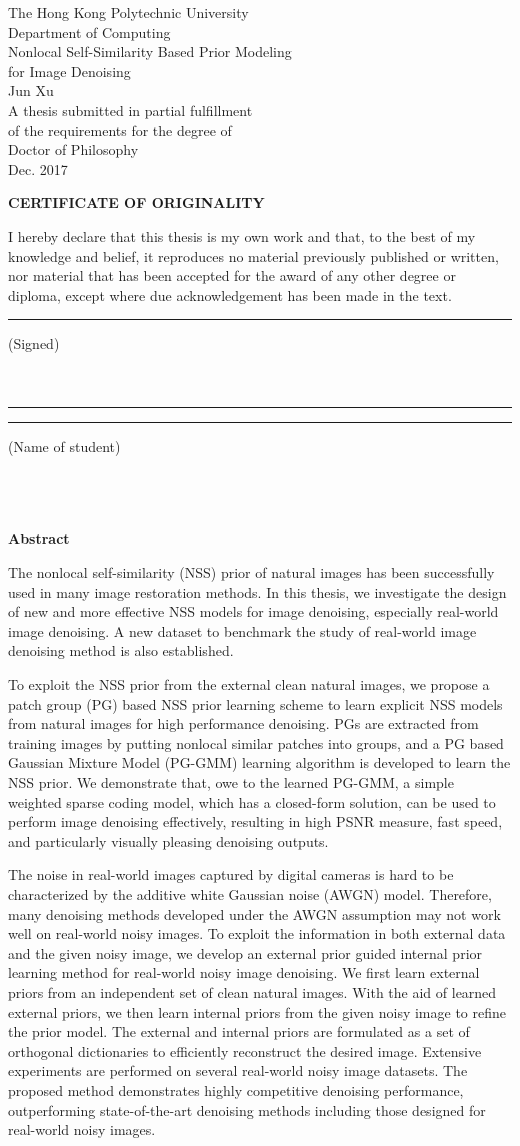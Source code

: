 \documentclass[12pt,oneside]{report}
\makeatletter
\numberwithin{figure}{chapter}
\newenvironment{preliminary}%
{\pagestyle{plain}\pagenumbering{roman}}%
{\pagenumbering{arabic}}
\newcommand\isdefinedsig[1]{%
  \edef\@tempa{#1}%
  \def\@tempb{}%
  \ifx\@tempa\@tempb
	\else\rule[-4.5pt]{5.5cm}{0.5pt}\signname\\ \\{#1}\\
  \fi
}
\newcommand\isdefinedsigname[1]{%
  \edef\@tempa{#1}%
  \def\@tempb{}%
  \ifx\@tempa\@tempb
	\else\rule[-5pt]{0.05cm}{0.5pt}\underline{}\rule[-5pt]{4cm}{0.5pt}\stuname\\ \\{#1}\\%
  \fi
}
\newcommand\isdefinedspinetitle[1]{%
  \edef\@tempa{#1}%
  \def\@tempb{}%
  \ifx\@tempa\@tempb
	\else (Spine title: #1)\\
  \fi
}
\newcommand{\signname}{(Signed)}
\newcommand{\stuname}{(Name of student)}
\newcommand{\department}{Computing}
\newcommand{\degree}{Doctor of Philosophy}
\newcommand{\firstname}{Jun}
\newcommand{\middlename}{}
\newcommand{\lastname}{Xu}
\newcommand{\authorname}{{\firstname} {\middlename} {\lastname}}
\newcommand{\titl}{Real-time and Robust Visual Tracking}
\newcommand{\thesisformat}{Monograph} %
\newcommand{\gyear}{\number\year}
\renewcommand{\maketitle}
{\begin{titlepage}
   \setcounter{page}{1}
   \begin{large}
   \begin{center}
      \mbox{}
      \vfill
	{\LARGE The Hong Kong Polytechnic University} \\
    {\Large Department of Computing}\\
      \vfill
      {\LARGE Nonlocal Self-Similarity Based Prior Modeling \\for Image Denoising} \\
      \vfill
       {\firstname}  {\lastname}\\

      \vfill
		A thesis submitted in partial fulfillment\\
		of the requirements for the degree of\\
		\degree\\
		\vfill
		\vfill
     Dec. 2017\\
      \vspace*{.2in}


   \end{center}
   \end{large}
   \end{titlepage}

}%
\newcommand{\makecert}{
   \setcounter{page}{2}
\vfill
\begin{center}
\large
\textbf{CERTIFICATE OF ORIGINALITY}\\
\vfill
\end{center}

\vfill
I hereby declare that this thesis is my own work and that, to the best of my knowledge and belief, it reproduces no material previously published or written, nor material that has been accepted for the award of any other degree or diploma, except where due acknowledgement has been made in the text. \\
\vfill
\vfill
\vfill
\hspace{2.5in}\isdefinedsig{ }
\vfill
\hspace{2.5in}\isdefinedsigname{ }\\
\vfill
\vfill
\vfill
\vfill
}
\makeatother
\begin{document}


\begin{preliminary}

\maketitle
{}
\makecert
\newpage


\Large\begin{center}\textbf{Abstract}\end{center}\normalsize


The nonlocal self-similarity (NSS) prior of natural images has been successfully used in many image restoration methods. In this thesis, we investigate the design of new and more effective NSS models for image denoising, especially real-world image denoising. A new dataset to benchmark the study of real-world image denoising method is also established.

To exploit the NSS prior from the external clean natural images, we propose a patch group (PG) based NSS prior learning scheme to learn explicit NSS models from natural images for high performance denoising. PGs are extracted from training images by putting nonlocal similar patches into groups, and a PG based Gaussian Mixture Model (PG-GMM) learning algorithm is developed to learn the NSS prior. We demonstrate that, owe to the learned PG-GMM, a simple weighted sparse coding model, which has a closed-form solution, can be used to perform image denoising effectively, resulting in high PSNR measure, fast speed, and particularly visually pleasing denoising outputs.

The noise in real-world images captured by digital cameras is hard to be characterized by the additive white Gaussian noise (AWGN) model. Therefore, many denoising methods developed under the AWGN assumption may not work well on real-world noisy images. To exploit the information in both external data and the given noisy image, we develop an external prior guided internal prior learning method for real-world noisy image denoising. We first learn external priors from an independent set of clean natural images. With the aid of learned external priors, we then learn internal priors from the given noisy image to refine the prior model. The external and internal priors are formulated as a set of orthogonal dictionaries to efficiently reconstruct the desired image. Extensive experiments are performed on several real-world noisy image datasets. The proposed method demonstrates highly competitive denoising performance, outperforming state-of-the-art denoising methods including those designed for real-world noisy images.


\end{preliminary}
\end{document}
